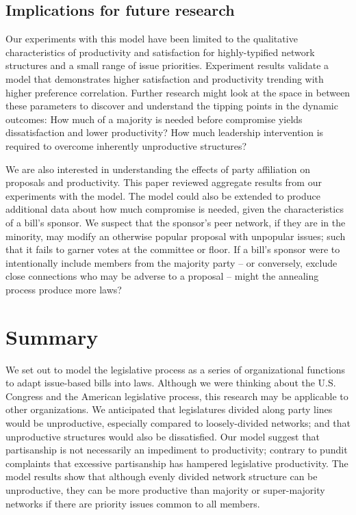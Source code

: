 \documentclass[pdftex,12pt]{llncs}
\begin{document}
\subsection{Implications for future research}
Our experiments with this model have been limited to the qualitative characteristics of productivity and satisfaction for highly-typified network structures and a small range of issue priorities.
Experiment results validate a model that demonstrates higher satisfaction and productivity trending with higher preference correlation. 
Further research might look at the space in between these parameters to discover and understand the tipping points in the dynamic outcomes:
How much of a majority is needed before compromise yields dissatisfaction and lower productivity? 
How much leadership intervention is required to overcome inherently unproductive structures?

We are also interested in understanding the effects of party affiliation on proposals and productivity. This paper reviewed aggregate results from our experiments with the model.
The model could also be extended to produce additional data about how much compromise is needed, given the characteristics of a bill's sponsor.
We suspect that the sponsor's peer network, if they are in the minority, may modify an otherwise popular proposal with unpopular issues; such that it fails to garner votes at the committee or floor. 
If a bill's sponsor were to intentionally include members from the majority party -- or conversely, exclude close connections who may be adverse to a proposal -- might the annealing process produce more laws?

\section{Summary}
We set out to model the legislative process as a series of organizational functions to adapt issue-based bills into laws.
Although we were thinking about the U.S. Congress and the American legislative process, this research may be applicable to other organizations.
We anticipated that legislatures divided along party lines would be unproductive, especially compared to loosely-divided networks; and that unproductive structures would also be dissatisfied.
Our model suggest that partisanship is not necessarily an impediment to productivity; contrary to pundit complaints that excessive partisanship has hampered legislative productivity.
The model results show that although evenly divided network structure can be unproductive, they can be more productive than majority or super-majority networks if there are priority issues common to all members. 
\end{document}
